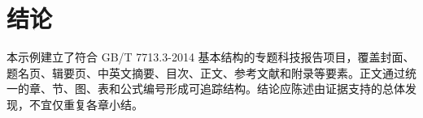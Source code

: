 \chapter{结论}

本示例建立了符合 GB/T 7713.3-2014 基本结构的专题科技报告项目，覆盖封面、题名页、辑要页、中英文摘要、目次、正文、参考文献和附录等要素。正文通过统一的章、节、图、表和公式编号形成可追踪结构。结论应陈述由证据支持的总体发现，不宜仅重复各章小结。
